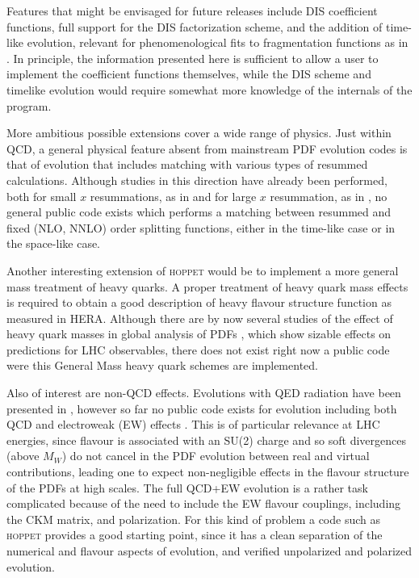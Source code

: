 \documentclass[12pt]{article}
\newcommand{\hoppet}{\textsc{hoppet}\xspace}
\begin{document}
Features that might be envisaged for future releases include DIS
coefficient functions, full support for the DIS factorization scheme,
and the addition of time-like evolution, relevant
for phenomenological fits to fragmentation functions
as in \cite{de Florian:2007hc}.  
In principle, the
information presented here is sufficient to allow a user to implement
the coefficient functions themselves, while the DIS scheme and
timelike evolution would require somewhat more knowledge of the
internals of the program. 

More ambitious possible extensions cover a wide range of physics.
Just within QCD, a general physical feature absent from mainstream PDF
evolution codes is that of evolution that includes matching with
various types of resummed calculations. Although studies in this direction
have already been performed, both for small $x$ resummations, 
as in \cite{White:2005wm}
 and for large $x$ resummation, as in \cite{Corcella:2005us},
no general public code exists which performs a matching between
resummed 
 and fixed (NLO, NNLO) order
splitting functions, either in the time-like case or in
the space-like case. 

Another interesting extension of \hoppet would be to
implement a more general mass treatment of heavy quarks.
A proper treatment of heavy quark mass effects is required to
obtain a good description of heavy flavour structure function
as measured in HERA. Although there are by now several studies
of the effect of heavy quark masses in global analysis
of PDFs \cite{Martin:2007bv,Tung:2006tb},
 which show sizable effects on predictions for
LHC observables, there does not exist right now a public code
were this General Mass heavy quark schemes are implemented.

Also of interest are non-QCD effects. Evolutions with QED radiation
have been presented in \cite{Weinzierl:2002mv,Martin:2004dh}, 
however so far no public code
exists for evolution including both QCD and electroweak (EW) effects
\cite{Ciafaloni:2000df,Ciafaloni:2005fm}.
This is of particular relevance at LHC energies, since flavour is
associated with an SU(2) charge and so soft divergences (above $M_W$)
do not cancel in the PDF evolution between real and virtual
contributions, leading one to expect
non-negligible effects in the flavour structure of the PDFs at high
scales.
%
The full QCD+EW evolution is a rather task complicated because of the
need to include the EW flavour couplings, including the CKM matrix,
and polarization. For this kind of problem a code such as \hoppet
provides a good starting point, since it has a clean separation of the
numerical and flavour aspects of evolution, and verified unpolarized
and polarized evolution.
\end{document}

